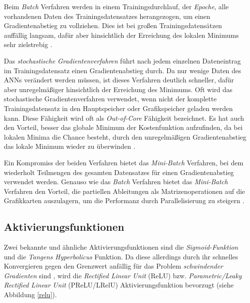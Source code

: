 Beim \textit{Batch} Verfahren werden in einem Trainingsdurchlauf, der \textit{Epoche}, alle vorhandenen Daten des Trainingsdatensatzes herangezogen, um einen Gradientenabstieg zu vollziehen. Dies ist bei großen Trainingsdatensätzen auffällig langsam, dafür aber hinsichtlich der Erreichung des lokalen Minimums sehr zielstrebig \cite{AurelienGeron.2018}.

Das \textit{stochastische Gradientenverfahren} führt nach jedem einzelnen Dateneintrag im Trainingsdatensatz einen Gradientenabstieg durch. Da nur wenige Daten des ANNs verändert werden müssen, ist dieses Verfahren deutlich schneller, dafür aber unregelmäßiger hinsichtlich der Erreichung des Minimums. Oft wird das stochastische Gradientenverfahren verwendet, wenn nicht der komplette Trainingsdatensatz in den Hauptspeicher oder Grafikspeicher geladen werden kann. Diese Fähigkeit wird oft als \textit{Out-of-Core} Fähigkeit bezeichnet. Es hat auch den Vorteil, besser das globale Minimum der Kostenfunktion aufzufinden, da bei lokalen Minima die Chance besteht, durch den unregelmäßigen Gradientenabstieg das lokale Minimum wieder zu überwinden \cite{AurelienGeron.2018}.

Ein Kompromiss der beiden Verfahren bietet das \textit{Mini-Batch} Verfahren, bei dem wiederholt Teilmengen des gesamten Datensatzes für einen Gradientenabstieg verwendet werden. Genauso wie das \textit{Batch} Verfahren bietet das \textit{Mini-Batch} Verfahren den Vorteil, die partiellen Ableitungen als Matrizenoperationen auf die Grafikkarten auszulagern, um die Performanz durch Parallelisierung zu steigern \cite{AurelienGeron.2018}.

\subsection*{Aktivierungsfunktionen}

Zwei bekannte und ähnliche Aktivierungsfunktionen sind die \textit{Sigmoid-Funktion} und die \textit{Tangens Hyperbolicus} Funktion. Da diese allerdings durch ihr schnelles Konvergieren gegen den Grenzwert anfällig für das Problem \textit{schwindender Gradienten} sind \cite{AurelienGeron.2018}, wird die \textit{Rectified Linear Unit} (ReLU) bzw. \textit{Parametric/Leaky Rectified Linear Unit} (PReLU/LRelU) Aktivierungsfunktion bevorzugt (siehe Abbildung \ref{relu}). 

